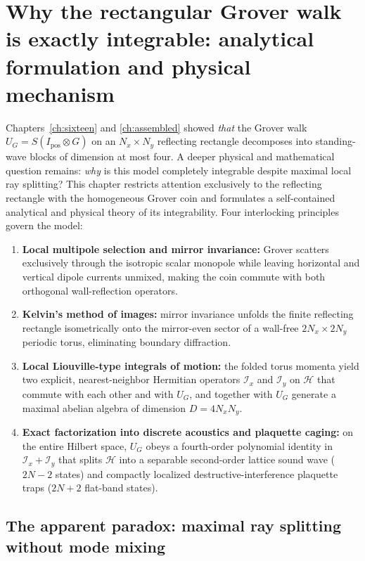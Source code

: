 \documentclass[11pt,a4paper,oneside]{report}
\newcommand{\HH}{\mathcal H}
\newcommand{\Id}{I}
\numberwithin{equation}{chapter}
\begin{document}
\chapter{Why the rectangular Grover walk is exactly integrable: analytical formulation and physical mechanism}
\label{ch:groverintegrability}

Chapters~\ref{ch:sixteen} and \ref{ch:assembled} showed \emph{that} the
Grover walk \(U_G=S(\Id_{\mathrm{pos}}\otimes G)\) on an \(N_x\times N_y\)
reflecting rectangle decomposes into standing-wave blocks of dimension at
most four. A deeper physical and mathematical question remains: \emph{why}
is this model completely integrable despite maximal local ray splitting?
This chapter restricts attention exclusively to the reflecting rectangle
with the homogeneous Grover coin and formulates a self-contained analytical
and physical theory of its integrability. Four interlocking principles
govern the model:
\begin{enumerate}
\item \textbf{Local multipole selection and mirror invariance:} Grover
scatters exclusively through the isotropic scalar monopole while leaving
horizontal and vertical dipole currents unmixed, making the coin commute
with both orthogonal wall-reflection operators.
\item \textbf{Kelvin's method of images:} mirror invariance unfolds the
finite reflecting rectangle isometrically onto the mirror-even sector of a
wall-free \(2N_x\times2N_y\) periodic torus, eliminating boundary diffraction.
\item \textbf{Local Liouville-type integrals of motion:} the folded torus
momenta yield two explicit, nearest-neighbor Hermitian operators
\(\mathcal I_x\) and \(\mathcal I_y\) on \(\HH\) that commute with each
other and with \(U_G\), and together with \(U_G\) generate a maximal
abelian algebra of dimension \(D=4N_xN_y\).
\item \textbf{Exact factorization into discrete acoustics and plaquette
caging:} on the entire Hilbert space, \(U_G\) obeys a fourth-order polynomial
identity in \(\mathcal I_x+\mathcal I_y\) that splits \(\HH\) into a
separable second-order lattice sound wave (\(2N-2\) states) and compactly
localized destructive-interference plaquette traps (\(2N+2\) flat-band states).
\end{enumerate}

\section{The apparent paradox: maximal ray splitting without mode mixing}
\end{document}
